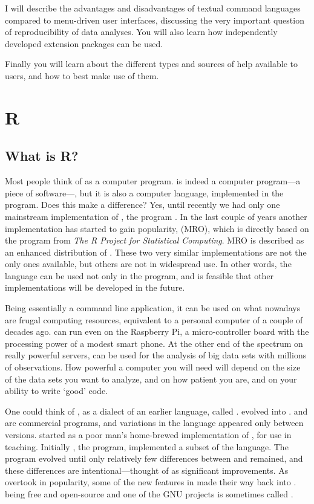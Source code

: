 \documentclass[krantz2]{krantz}\usepackage{knitr}%
\begin{document}
I will describe the advantages and disadvantages of textual command languages compared to menu-driven user interfaces, discussing the very important question of reproducibility of data analyses. You will also learn how independently developed extension packages can be used.

Finally you will learn about the different types and sources of help available to \Rlang users, and how to best make use of them.

\section{R}

\subsection{What is R?}

Most people think of \Rpgrm as a computer program. \Rpgrm is indeed a computer program---a piece of software---, but it is also a computer language, implemented in the \Rpgrm program. Does this make a difference? Yes, until recently we had only one mainstream implementation of \Rlang, the program \Rpgrm. In the last couple of years another implementation has started to gain popularity,  (MRO), which is directly based on the \Rpgrm program from \textit{The R Project for Statistical Computing}. MRO is described as an enhanced distribution of \Rpgrm. These two very similar implementations are not the only ones available, but others are not in widespread use. In other words, the \Rlang language can be used not only in the \Rpgrm program, and is feasible that other implementations will be developed in the future.

Being \Rpgrm essentially a command line application, it can be used on what nowadays are frugal computing resources, equivalent to a personal computer of a couple of decades ago. \Rpgrm can run even on the Raspberry Pi, a micro-controller board with the processing power of a modest smart phone. At the other end of the spectrum on really powerful servers, \Rpgrm can be used for the analysis of big data sets with millions of observations. How powerful a computer you will need will depend on the size of the data sets you want to analyze, and on how patient you are, and on your ability to write `good' code.

One could think of \Rlang, as a dialect of an earlier language, called \Slang. \Slang evolved into \Splang \autocite{Becker1988}. \Slang and \Splang are commercial programs, and variations in the language appeared only between versions. \Rlang started as a poor man's home-brewed implementation of \Slang, for use in teaching. Initially \Rpgrm, the program, implemented a subset of the \Slang language. The \Rpgrm program evolved until only relatively few differences between \Slang and \Rlang remained, and these differences are intentional---thought of as significant improvements. As \Rlang overtook \Splang in popularity, some of the new features in \Rlang made their way back into \Splang. \Rpgrm being free and open-source and one of the GNU projects is sometimes called .
\end{document}
